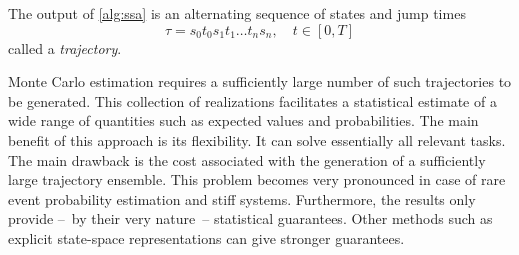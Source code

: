 The output of \autoref{alg:ssa} is an alternating sequence of states and jump times
\[
	\tau = s_0t_0s_1t_1\dots t_n s_n, \quad t\in[0,T]
\]
called a \emph{trajectory}.

Monte Carlo estimation requires a sufficiently large number of such trajectories to
be generated.
This collection of realizations facilitates a statistical estimate of
a wide range of quantities such as expected values and probabilities.
The main benefit of this approach is its flexibility.
It can solve essentially all relevant tasks.
The main drawback is the cost associated with the generation of a sufficiently large trajectory ensemble.
This problem becomes very pronounced in case of rare event probability estimation and stiff systems.
Furthermore, the results only provide --~by their very nature~-- statistical guarantees.
Other methods such as explicit state-space representations can give stronger guarantees.


